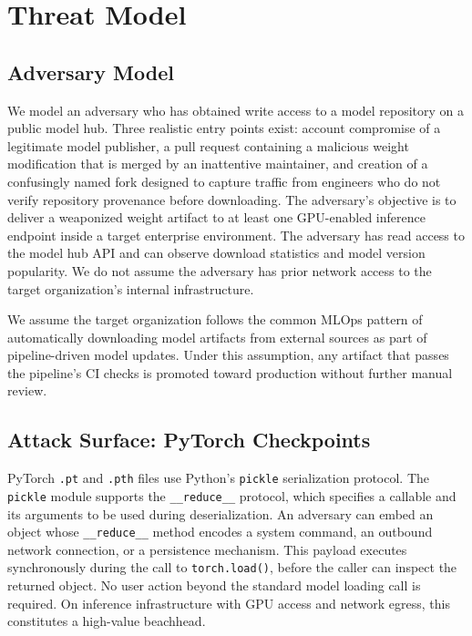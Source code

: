 \documentclass[preprint,12pt,twocolumn]{elsarticle}
\begin{document}
\section{Threat Model}
\label{sec:threat}

\subsection{Adversary Model}

We model an adversary who has obtained write access to a model repository
on a public model hub. Three realistic entry points exist: account
compromise of a legitimate model publisher, a pull request containing a
malicious weight modification that is merged by an inattentive maintainer,
and creation of a confusingly named fork designed to capture traffic from
engineers who do not verify repository provenance before downloading. The
adversary's objective is to deliver a weaponized weight artifact to at
least one GPU-enabled inference endpoint inside a target enterprise
environment. The adversary has read access to the model hub API and can
observe download statistics and model version popularity. We do not assume
the adversary has prior network access to the target organization's internal
infrastructure.

We assume the target organization follows the common MLOps pattern of
automatically downloading model artifacts from external sources as part of
pipeline-driven model updates. Under this assumption, any artifact that
passes the pipeline's CI checks is promoted toward production without
further manual review.

\subsection{Attack Surface: PyTorch Checkpoints}

PyTorch \texttt{.pt} and \texttt{.pth} files use Python's \texttt{pickle}
serialization protocol. The \texttt{pickle} module supports the
\texttt{\_\_reduce\_\_} protocol, which specifies a callable and its
arguments to be used during deserialization. An adversary can embed an
object whose \texttt{\_\_reduce\_\_} method encodes a system command, an
outbound network connection, or a persistence mechanism. This payload
executes synchronously during the call to \texttt{torch.load()}, before the
caller can inspect the returned object. No user action beyond the standard
model loading call is required. On inference infrastructure with GPU access
and network egress, this constitutes a high-value beachhead.
\end{document}
